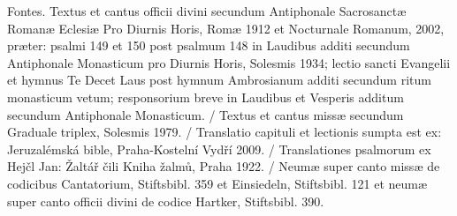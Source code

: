 \documentclass[a4paper, twoside, 12pt]{article}
\begin{document}

\vfill
\pagebreak



\vfill
\pagebreak

\vfill

 


\vfill

\vspace{2.6cm}

 


\vfill
\pagebreak


\vfill

 


\vspace{1cm}
 


\vfill
\pagebreak

 




\cantusSineNeumas

%

\vfill
\pagebreak

\newpage
\RemoveSideThumbs
\pagestyle{empty}

\vfill

Fontes.
Textus et cantus officii divini secundum
Antiphonale Sacrosanctæ Romanæ Eclesiæ Pro Diurnis Horis, Romæ 1912
et Nocturnale Romanum, 2002, præter: psalmi 149 et 150 post
psalmum 148 in Laudibus additi secundum Antiphonale Monasticum pro Diurnis Horis,
Solesmis 1934; lectio sancti Evangelii et hymnus Te Decet Laus post hymnum
Ambrosianum additi secundum ritum monasticum vetum; responsorium breve
in Laudibus et Vesperis additum secundum Antiphonale Monasticum. /
Textus et cantus missæ secundum
Graduale triplex, Solesmis 1979. /
Translatio capituli et lectionis sumpta est ex:
Jeruzalémská bible, Praha-Kostelní Vydří 2009. /
Translationes psalmorum ex
Hejčl Jan: Žaltář čili Kniha žalmů, Praha 1922. /
Neumæ super canto missæ de codicibus Cantatorium, Stiftsbibl. 359 et Einsiedeln,
Stiftsbibl. 121 et neumæ super canto officii divini de codice Hartker,
Stiftsbibl. 390.
\end{document}
